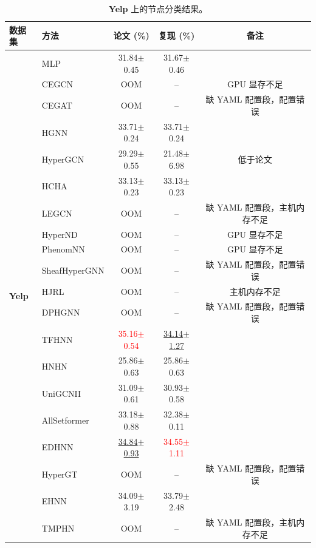 \documentclass[11pt,a4paper]{article}
\begin{document}
\begin{table}[H]
	\centering\small
	\begin{tabular}{llccc}
		\toprule
		数据集 & 方法 & 论文 (\%) & 复现 (\%) & 备注 \\
		\midrule
		\multirow{20}{*}{\textbf{Yelp}} & MLP               & 31.84$\pm$0.45   & 31.67$\pm$0.46   &  \\
		 & CEGCN             & OOM              & --               & GPU 显存不足 \\
		 & CEGAT             & OOM              & --               & 缺 YAML 配置段，配置错误 \\
		 & HGNN              & 33.71$\pm$0.24   & 33.71$\pm$0.24   &  \\
		 & HyperGCN          & 29.29$\pm$0.55   & 21.48$\pm$6.98   & 低于论文 \\
		 & HCHA              & 33.13$\pm$0.23   & 33.13$\pm$0.23   &  \\
		 & LEGCN             & OOM              & --               & 缺 YAML 配置段，主机内存不足 \\
		 & HyperND           & OOM              & --               & GPU 显存不足 \\
		 & PhenomNN          & OOM              & --               & GPU 显存不足 \\
		 & SheafHyperGNN     & OOM              & --               & 缺 YAML 配置段，配置错误 \\
		 & HJRL              & OOM              & --               & 主机内存不足 \\
		 & DPHGNN            & OOM              & --               & 缺 YAML 配置段，配置错误 \\
		 & TFHNN             & \textcolor{red}{35.16$\pm$0.54}   & \underline{34.14$\pm$1.27}   &  \\
		 & HNHN              & 25.86$\pm$0.63   & 25.86$\pm$0.63   &  \\
		 & UniGCNII          & 31.09$\pm$0.61   & 30.93$\pm$0.58   &  \\
		 & AllSetformer      & 33.18$\pm$0.88   & 32.38$\pm$0.11   &  \\
		 & EDHNN             & \underline{34.84$\pm$0.93}   & \textcolor{red}{34.55$\pm$1.11}   &  \\
		 & HyperGT           & OOM              & --               & 缺 YAML 配置段，配置错误 \\
		 & EHNN              & 34.09$\pm$3.19   & 33.79$\pm$2.48   &  \\
		 & TMPHN             & OOM              & --               & 缺 YAML 配置段，主机内存不足 \\
		\bottomrule
	\end{tabular}
	\caption{\textbf{Yelp} 上的节点分类结果。}
\end{table}
\end{document}
